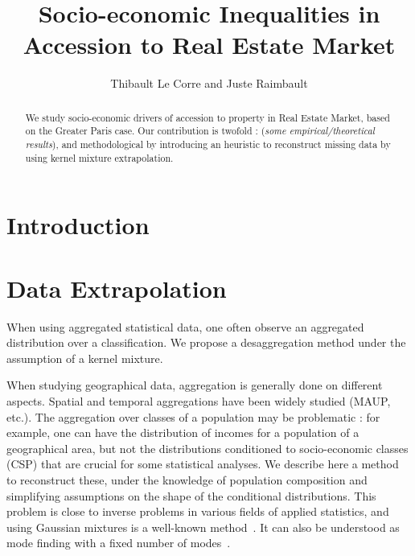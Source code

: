 

\title{
Socio-economic Inequalities in Accession to Real Estate Market
}

\author{Thibault Le Corre and Juste Raimbault}




\begin{abstract}
We study socio-economic drivers of accession to property in Real Estate Market, based on the Greater Paris case. Our contribution is twofold : (\textit{some empirical/theoretical results}), and methodological by introducing an heuristic to reconstruct missing data by using kernel mixture extrapolation.
\end{abstract}


\maketitle


\section{Introduction}








\section{Data Extrapolation}

When using aggregated statistical data, one often observe an aggregated distribution over a classification. We propose a desaggregation method under the assumption of a kernel mixture.

When studying geographical data, aggregation is generally done on different aspects. Spatial and temporal aggregations have been widely studied (MAUP, etc.). The aggregation over classes of a population may be problematic : for example, one can have the distribution of incomes for a population of a geographical area, but not the distributions conditioned to socio-economic classes (CSP) that are crucial for some statistical analyses. We describe here a method to reconstruct these, under the knowledge of population composition and simplifying assumptions on the shape of the conditional distributions. This problem is close to inverse problems in various fields of applied statistics, and using Gaussian mixtures is a well-known method~\cite{yu2012solving}. It can also be understood as mode finding with a fixed number of modes~\cite{carreira2000mode}.



